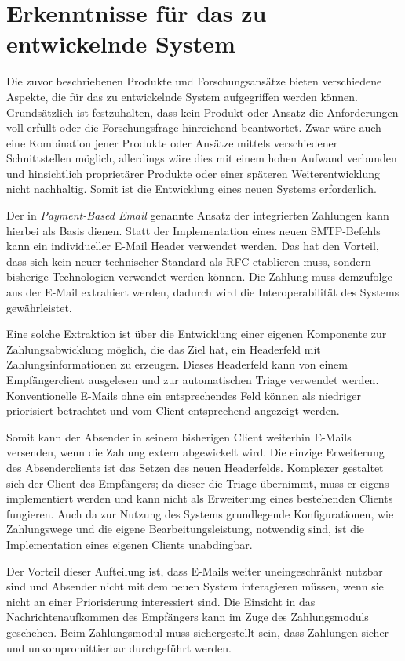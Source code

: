 
\section{Erkenntnisse für das zu entwickelnde System}
\label{Erkenntnisse_fuer_das_zu_entwickelnde_System}
Die zuvor beschriebenen Produkte und Forschungsansätze bieten verschiedene Aspekte, die für das zu entwickelnde System aufgegriffen werden können. Grundsätzlich ist festzuhalten, dass kein Produkt oder Ansatz die Anforderungen voll erfüllt oder die Forschungsfrage hinreichend beantwortet. Zwar wäre auch eine Kombination jener Produkte oder Ansätze mittels verschiedener Schnittstellen möglich, allerdings wäre dies mit einem hohen Aufwand verbunden und hinsichtlich proprietärer Produkte oder einer späteren Weiterentwicklung nicht nachhaltig. Somit ist die Entwicklung eines neuen Systems erforderlich.

Der in \textit{Payment-Based Email} genannte Ansatz der integrierten Zahlungen kann hierbei als Basis dienen. Statt der Implementation eines neuen SMTP-Befehls kann ein individueller E-Mail Header verwendet werden. Das hat den Vorteil, dass sich kein neuer technischer Standard als RFC etablieren muss, sondern bisherige Technologien verwendet werden können. Die Zahlung muss demzufolge aus der E-Mail extrahiert werden, dadurch wird die Interoperabilität des Systems gewährleistet. 

Eine solche Extraktion ist über die Entwicklung einer eigenen Komponente zur Zahlungsabwicklung möglich, die das Ziel hat, ein Headerfeld mit Zahlungsinformationen zu erzeugen. Dieses Headerfeld kann von einem Empfängerclient ausgelesen und zur automatischen Triage verwendet werden. Konventionelle E-Mails ohne ein entsprechendes Feld können als niedriger priorisiert betrachtet und vom Client entsprechend angezeigt werden.

Somit kann der Absender in seinem bisherigen Client weiterhin E-Mails versenden, wenn die Zahlung extern abgewickelt wird. Die einzige Erweiterung des Absenderclients ist das Setzen des neuen Headerfelds. Komplexer gestaltet sich der Client des Empfängers; da dieser die Triage übernimmt, muss er eigens implementiert werden und kann nicht als Erweiterung eines bestehenden Clients fungieren. Auch da zur Nutzung des Systems grundlegende Konfigurationen, wie Zahlungswege und die eigene Bearbeitungsleistung, notwendig sind, ist die Implementation eines eigenen Clients unabdingbar.

Der Vorteil dieser Aufteilung ist, dass E-Mails weiter uneingeschränkt nutzbar sind und Absender nicht mit dem neuen System interagieren müssen, wenn sie nicht an einer Priorisierung interessiert sind. Die Einsicht in das Nachrichtenaufkommen des Empfängers kann im Zuge des Zahlungsmoduls geschehen. Beim Zahlungsmodul muss sichergestellt sein, dass Zahlungen sicher und unkompromittierbar durchgeführt werden.


